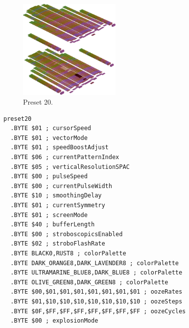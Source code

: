\vspace*{0.4cm}
\begin{minipage}[b]{0.48\linewidth}
\begin{figure}[H]                                                          
  \centering                                                             
  \begin{adjustbox}{width=5cm,center}                                   
  \includegraphics[width=5cm]{src/colorspace_presets/preset20-45.png}%
  \end{adjustbox}                                                        
\caption*{Preset 20.}                                           
\end{figure}                                                               
\end{minipage}
\hspace{0.1cm}
\begin{minipage}[b]{0.48\linewidth}                                                                         
\begin{lstlisting}[basicstyle=\ttfamily\tiny]
preset20
  .BYTE $01 ; cursorSpeed
  .BYTE $01 ; vectorMode
  .BYTE $01 ; speedBoostAdjust
  .BYTE $06 ; currentPatternIndex
  .BYTE $05 ; verticalResolutionSPAC
  .BYTE $00 ; pulseSpeed
  .BYTE $00 ; currentPulseWidth
  .BYTE $10 ; smoothingDelay
  .BYTE $01 ; currentSymmetry
  .BYTE $01 ; screenMode
  .BYTE $40 ; bufferLength
  .BYTE $00 ; stroboscopicsEnabled
  .BYTE $02 ; stroboFlashRate
  .BYTE BLACK0,RUST8 ; colorPalette
  .BYTE DARK_ORANGE8,DARK_LAVENDER8 ; colorPalette
  .BYTE ULTRAMARINE_BLUE8,DARK_BLUE8 ; colorPalette
  .BYTE OLIVE_GREEN8,DARK_GREEN8 ; colorPalette
  .BYTE $00,$01,$01,$01,$01,$01,$01,$01 ; oozeRates
  .BYTE $01,$10,$10,$10,$10,$10,$10,$10 ; oozeSteps
  .BYTE $0F,$FF,$FF,$FF,$FF,$FF,$FF,$FF ; oozeCycles
  .BYTE $00 ; explosionMode
\end{lstlisting}
\end{minipage}


